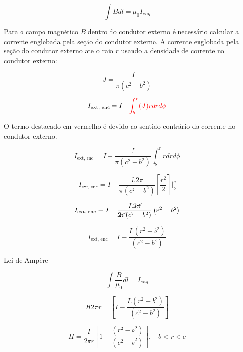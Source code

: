 \begin{flushleft}
\[
\int B dl = \mu_{0}I_{eng}
\]

Para o campo magnético \(B\) dentro do condutor externo \'e necess\'ario 
calcular a corrente englobada pela seção do condutor externo. A corrente englobada pela seção do 
condutor externo ate o raio \(r\) usando a densidade de corrente no condutor externo:

\[
J = \frac{I}{\pi(c^{2} - b^{2})}
\]

\[
I_{\text{ext, enc}} = I \textcolor{red}{- \int_{b}^{r} (J) rdrd\phi}
\]

O termo destacado em vermelho \'e devido ao sentido contrário da corrente no condutor externo.

\[
I_{\text{ext, enc}} = I - \frac{I}{\pi(c^{2} - b^{2})}\int_{b}^{r} rdrd\phi
\]

\[
I_{\text{ext, enc}} = I - \frac{I.2\pi}{\pi(c^{2} - b^{2})}\left[\frac{r^2}{2}\right]\Big|_{b}^{c}
\]

\[
I_{\text{ext, enc}} = I - \frac{I.\cancel{2\pi}}{\cancel{2\pi}(c^{2} - b^{2})}\left(r^{2} - b^{2}\right)
\]

\[
I_{\text{ext, enc}} = I - \frac{I.\left(r^{2} - b^{2}\right)}{(c^{2} - b^{2})}
\]

Lei de Ampère

\[
\int \frac{B}{\mu_{0}} dl = I_{eng}
\]

\[
H 2\pi r = \left[I - \frac{I.\left(r^{2} - b^{2}\right)}{(c^{2} - b^{2})}\right]
\]

\[
\boxed{
H  = \frac{I}{2\pi r}\left[1 - \frac{\left(r^{2} - b^{2}\right)}{(c^{2} - b^{2})}\right], \quad \textrm{\(b < r < c\)}
}
\]

\end{flushleft}


